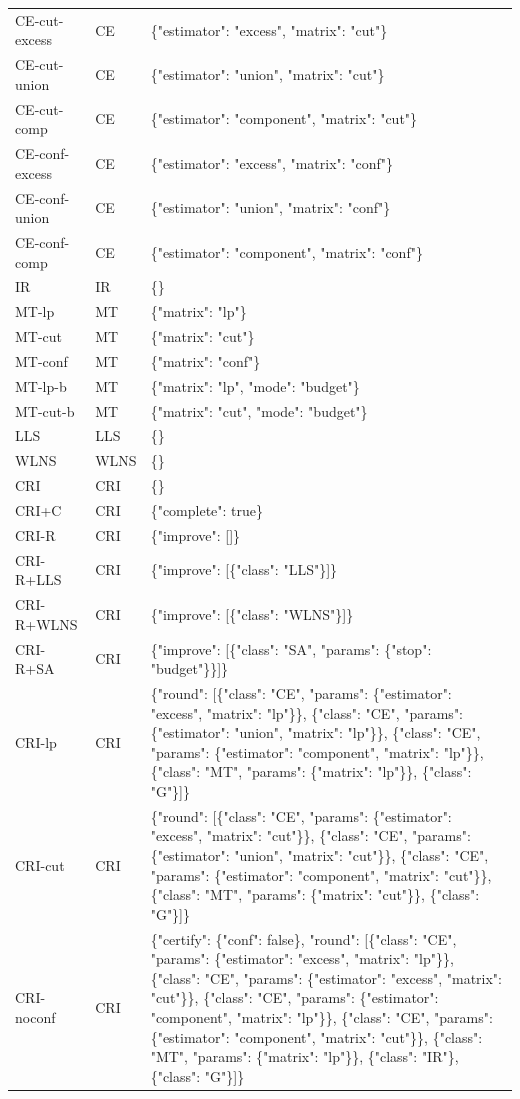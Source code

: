 \begin{table}[htbp]
\begin{tabular}{lll}
CE-cut-excess & CE & \{"estimator": "excess", "matrix": "cut"\} \\
CE-cut-union & CE & \{"estimator": "union", "matrix": "cut"\} \\
CE-cut-comp & CE & \{"estimator": "component", "matrix": "cut"\} \\
CE-conf-excess & CE & \{"estimator": "excess", "matrix": "conf"\} \\
CE-conf-union & CE & \{"estimator": "union", "matrix": "conf"\} \\
CE-conf-comp & CE & \{"estimator": "component", "matrix": "conf"\} \\
IR & IR & \{\} \\
MT-lp & MT & \{"matrix": "lp"\} \\
MT-cut & MT & \{"matrix": "cut"\} \\
MT-conf & MT & \{"matrix": "conf"\} \\
MT-lp-b & MT & \{"matrix": "lp", "mode": "budget"\} \\
MT-cut-b & MT & \{"matrix": "cut", "mode": "budget"\} \\
LLS & LLS & \{\} \\
WLNS & WLNS & \{\} \\
CRI & CRI & \{\} \\
CRI+C & CRI & \{"complete": true\} \\
CRI-R & CRI & \{"improve": []\} \\
CRI-R+LLS & CRI & \{"improve": [\{"class": "LLS"\}]\} \\
CRI-R+WLNS & CRI & \{"improve": [\{"class": "WLNS"\}]\} \\
CRI-R+SA & CRI & \{"improve": [\{"class": "SA", "params": \{"stop": "budget"\}\}]\} \\
CRI-lp & CRI & \{"round": [\{"class": "CE", "params": \{"estimator": "excess", "matrix": "lp"\}\}, \{"class": "CE", "params": \{"estimator": "union", "matrix": "lp"\}\}, \{"class": "CE", "params": \{"estimator": "component", "matrix": "lp"\}\}, \{"class": "MT", "params": \{"matrix": "lp"\}\}, \{"class": "G"\}]\} \\
CRI-cut & CRI & \{"round": [\{"class": "CE", "params": \{"estimator": "excess", "matrix": "cut"\}\}, \{"class": "CE", "params": \{"estimator": "union", "matrix": "cut"\}\}, \{"class": "CE", "params": \{"estimator": "component", "matrix": "cut"\}\}, \{"class": "MT", "params": \{"matrix": "cut"\}\}, \{"class": "G"\}]\} \\
CRI-noconf & CRI & \{"certify": \{"conf": false\}, "round": [\{"class": "CE", "params": \{"estimator": "excess", "matrix": "lp"\}\}, \{"class": "CE", "params": \{"estimator": "excess", "matrix": "cut"\}\}, \{"class": "CE", "params": \{"estimator": "component", "matrix": "lp"\}\}, \{"class": "CE", "params": \{"estimator": "component", "matrix": "cut"\}\}, \{"class": "MT", "params": \{"matrix": "lp"\}\}, \{"class": "IR"\}, \{"class": "G"\}]\} \\

\end{tabular}
\end{table}
